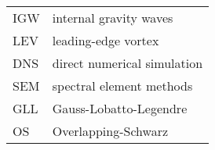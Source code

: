 %
%
%
%

\begin{acronyms}

\renewcommand{\arraystretch}{1.5}
\setlength{\tabcolsep}{3mm}
{\begin {tabular}{ll}
IGW & internal gravity waves\\
LEV & leading-edge vortex\\
DNS & direct numerical simulation\\
SEM & spectral element methods\\
GLL & Gauss-Lobatto-Legendre\\
OS & Overlapping-Schwarz\\
\end {tabular}}

\end{acronyms}
